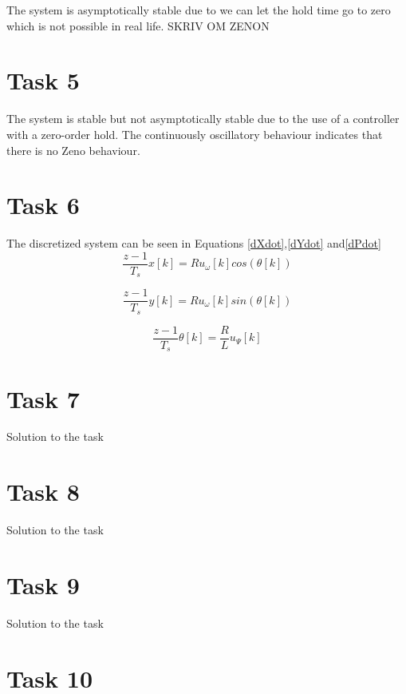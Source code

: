 \documentclass[a4paper,12pt,oneside,onecolumn]{article} %
\begin{document}
The system is asymptotically stable due to we can let the hold time go to zero which is not possible in real life. SKRIV OM ZENON


\section*{Task 5}

The system is stable but not asymptotically stable due to the use of a controller with a zero-order hold. The continuously oscillatory behaviour indicates that there is no Zeno behaviour.
\section*{Task 6}

The discretized system can be seen in Equations \eqref{dXdot},\eqref{dYdot} and\eqref{dPdot}
\begin{equation}
\frac{z-1}{T_s} x[k] = Ru_\omega[k] cos(\theta[k])\label{dXdot}
\end{equation}

\begin{equation}
\frac{z-1}{T_s} y[k] = Ru_\omega[k] sin(\theta[k]) \label{dYdot}
\end{equation}

\begin{equation}
\frac{z-1}{T_s} \theta[k] = \frac{R}{L}u_\Psi[k]\label{dPdot}
\end{equation}


\section*{Task 7}

Solution to the task

\section*{Task 8}

Solution to the task

\section*{Task 9}

Solution to the task

\section*{Task 10}
\end{document}
